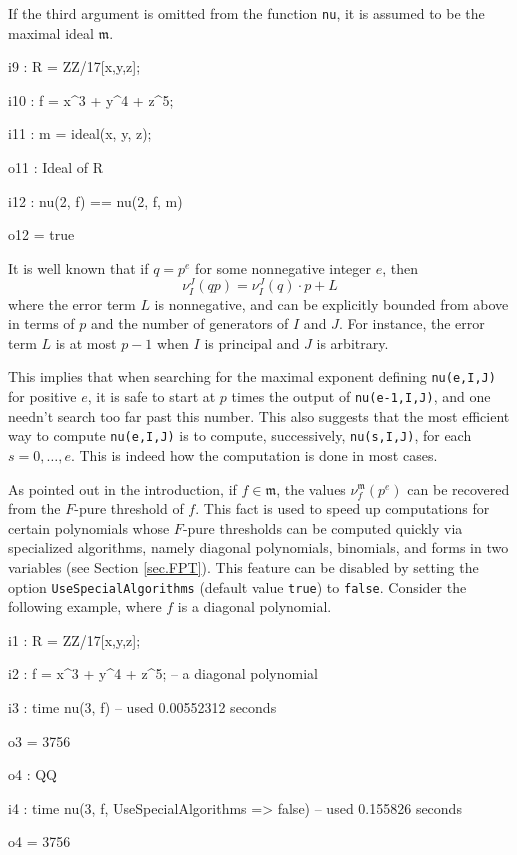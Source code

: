 \documentclass{amsart}
\newcommand{\idealm}{\mathfrak{m}}
\begin{document}

If the third argument is omitted from the function {\tt nu}, it is assumed to be the maximal ideal $\idealm$.

{\small
{}
\begin{MyVerbatim}

i9 : R = ZZ/17[x,y,z];

i10 : f = x^3 + y^4 + z^5;

i11 : m = ideal(x, y, z);

o11 : Ideal of R

i12 : nu(2, f) == nu(2, f, m)

o12 = true
\end{MyVerbatim}
}
\medspace


It is well known that if $q=p^e$ for some nonnegative integer $e$, then \[ \nu_I^J(qp) = \nu_I^J(q)\cdot p + L\]  where the error term $L$ is nonnegative, and can be explicitly bounded from above in terms of $p$ and the number of generators of $I$ and $J$.  For instance, the error term $L$ is at most $p-1$ when $I$ is principal and $J$ is arbitrary.

This implies that when searching for the maximal exponent defining {\tt nu(e,I,J)} for positive $e$, it is safe to start at $p$ times the output of {\tt nu(e-1,I,J)}, and one needn't search too far past this number.  This also suggests that the most efficient way to compute {\tt nu(e,I,J)} is to compute, successively, {\tt nu(s,I,J)}, for each $s = 0,\ldots,e$.  This is indeed how the computation is done in most cases.

As pointed out in the introduction, if $f \in \mathfrak{m}$, the values $\nu^{\mathfrak{m}}_f(p^e)$ can be recovered from the $F$-pure threshold of $f$.
This fact is used to speed up computations for certain polynomials whose $F$-pure thresholds can be computed quickly via specialized algorithms, namely diagonal polynomials, binomials, and forms in two variables (see Section \ref{sec.FPT}).  This feature can be disabled by setting the option {\tt UseSpecialAlgorithms} (default value {\tt true}) to {\tt false}.  Consider the following example, where $f$ is a diagonal polynomial.

{\small
{}
\begin{MyVerbatim}

i1 : R = ZZ/17[x,y,z];

i2 : f = x^3 + y^4 + z^5; -- a diagonal polynomial

i3 : time nu(3, f)
     -- used 0.00552312 seconds

o3 = 3756

o4 : QQ

i4 : time nu(3, f, UseSpecialAlgorithms => false)
     -- used 0.155826 seconds

o4 = 3756
\end{MyVerbatim}
}
\medspace
\end{document}
